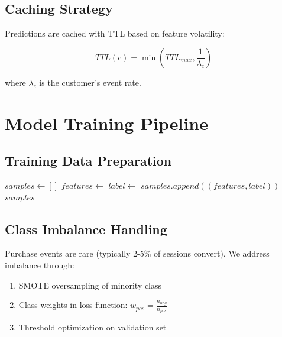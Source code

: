 \documentclass[11pt,a4paper]{article}
\begin{document}
\subsection{Caching Strategy}

Predictions are cached with TTL based on feature volatility:

\begin{equation}
TTL(c) = \min(TTL_{max}, \frac{1}{\lambda_c})
\end{equation}

where $\lambda_c$ is the customer's event rate.

\section{Model Training Pipeline}

\subsection{Training Data Preparation}

\begin{algorithm}
\caption{Training Data Generation}
\begin{algorithmic}[1]
    \State $samples \gets []$
            \State $features \gets$ 
            \State $label \gets$ 
            \State $samples.append((features, label))$
        \EndFor
    \EndFor
    \State \Return $samples$
\EndFunction
\end{algorithmic}
\end{algorithm}

\subsection{Class Imbalance Handling}

Purchase events are rare (typically 2-5\% of sessions convert). We address imbalance through:

\begin{enumerate}
    \item SMOTE oversampling of minority class
    \item Class weights in loss function: $w_{pos} = \frac{n_{neg}}{n_{pos}}$
    \item Threshold optimization on validation set
\end{enumerate}
\end{document}
